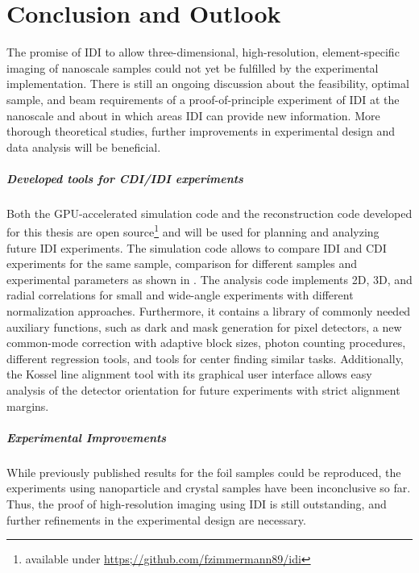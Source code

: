 \chapter{Conclusion and Outlook}
The promise of IDI to allow three-dimensional, high-resolution, element-specific imaging of nanoscale samples could not yet be fulfilled by the experimental implementation. There is still an ongoing discussion about the feasibility, optimal sample, and beam requirements of a proof-of-principle experiment of IDI at the nanoscale and about in which areas IDI can provide new information. More thorough theoretical studies, further improvements in experimental design and data analysis will be beneficial.

\paragraph{Developed tools for CDI/IDI experiments}
Both the GPU-accelerated simulation code and the reconstruction code developed for this thesis are open source\footnote{available under \url{https;//github.com/fzimmermann89/idi}} and will be used for planning and analyzing future IDI experiments. The simulation code allows to compare IDI and CDI experiments for the same sample, comparison for different samples and experimental parameters as shown in .
The analysis code implements 2D, 3D, and radial correlations for small and wide-angle experiments with different normalization approaches. Furthermore, it contains a library of commonly needed auxiliary functions, such as dark and mask generation for pixel detectors, a new common-mode correction with adaptive block sizes, photon counting procedures, different regression tools, and tools for center finding similar tasks.
Additionally, the Kossel line alignment tool with its graphical user interface allows easy analysis of the detector orientation for future experiments with strict alignment margins.

\paragraph{Experimental Improvements}
While previously published results for the foil samples could be reproduced, the experiments using nanoparticle and crystal samples have been inconclusive so far. Thus, the proof of high-resolution imaging using IDI is still outstanding, and further refinements in the experimental design are necessary.

